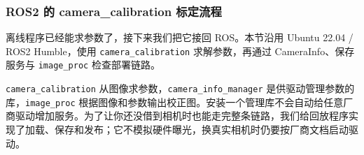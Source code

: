\subsubsection{ROS2 的 camera\_calibration 标定流程}
\label{sec:ros2-camera-calibration}

离线程序已经能求参数了，接下来我们把它接回 ROS。本节沿用 Ubuntu 22.04 / ROS2 Humble，使用 \texttt{camera\_calibration} 求解参数，再通过 CameraInfo、保存服务与 \texttt{image\_proc} 检查部署链路。

\texttt{camera\_calibration} 从图像求参数，\texttt{camera\_info\_manager} 是供驱动管理参数的库，\texttt{image\_proc} 根据图像和参数输出校正图。安装一个管理库不会自动给任意厂商驱动增加服务。为了让你还没借到相机时也能走完整条链路，我们给回放程序实现了加载、保存和发布；它不模拟硬件曝光，换真实相机时仍要按厂商文档启动驱动。

